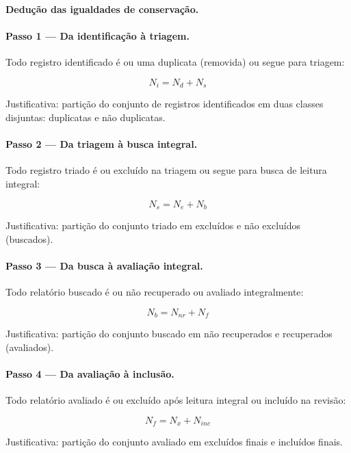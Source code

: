 \begin{metodo}
\textbf{Dedução das igualdades de conservação.}

\paragraph{Passo 1 — Da identificação à triagem.}
Todo registro identificado é ou uma duplicata (removida) ou segue para triagem:

\[
\boxed{N_i = N_d + N_s}
\]

Justificativa: partição do conjunto de registros identificados em duas classes disjuntas: duplicatas e não duplicatas.

\paragraph{Passo 2 — Da triagem à busca integral.}
Todo registro triado é ou excluído na triagem ou segue para busca de leitura integral:

\[
\boxed{N_s = N_e + N_b}
\]

Justificativa: partição do conjunto triado em excluídos e não excluídos (buscados).

\paragraph{Passo 3 — Da busca à avaliação integral.}
Todo relatório buscado é ou não recuperado ou avaliado integralmente:

\[
\boxed{N_b = N_{nr} + N_f}
\]

Justificativa: partição do conjunto buscado em não recuperados e recuperados (avaliados).

\paragraph{Passo 4 — Da avaliação à inclusão.}
Todo relatório avaliado é ou excluído após leitura integral ou incluído na revisão:

\[
\boxed{N_f = N_x + N_{inc}}
\]

Justificativa: partição do conjunto avaliado em excluídos finais e incluídos finais.
\end{metodo}

